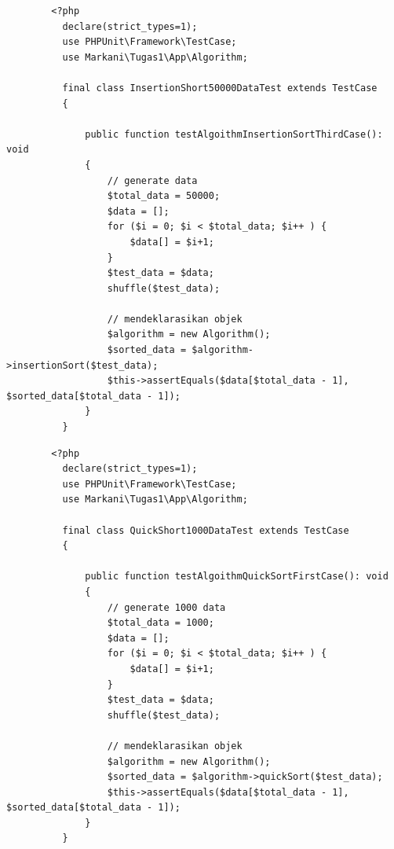 \documentclass[12pt,a4paper,oneside]{report}
\begin{document}
      \begin{lstlisting}
        <?php
          declare(strict_types=1);
          use PHPUnit\Framework\TestCase;
          use Markani\Tugas1\App\Algorithm;

          final class InsertionShort50000DataTest extends TestCase
          {

              public function testAlgoithmInsertionSortThirdCase(): void
              {
                  // generate data
                  $total_data = 50000;
                  $data = [];
                  for ($i = 0; $i < $total_data; $i++ ) {
                      $data[] = $i+1;
                  }
                  $test_data = $data;
                  shuffle($test_data);

                  // mendeklarasikan objek
                  $algorithm = new Algorithm();
                  $sorted_data = $algorithm->insertionSort($test_data);
                  $this->assertEquals($data[$total_data - 1], $sorted_data[$total_data - 1]);
              }
          }
      \end{lstlisting}

      \begin{lstlisting}
        <?php
          declare(strict_types=1);
          use PHPUnit\Framework\TestCase;
          use Markani\Tugas1\App\Algorithm;

          final class QuickShort1000DataTest extends TestCase
          {

              public function testAlgoithmQuickSortFirstCase(): void
              {
                  // generate 1000 data
                  $total_data = 1000;
                  $data = [];
                  for ($i = 0; $i < $total_data; $i++ ) {
                      $data[] = $i+1;
                  }
                  $test_data = $data;
                  shuffle($test_data);

                  // mendeklarasikan objek
                  $algorithm = new Algorithm();
                  $sorted_data = $algorithm->quickSort($test_data);
                  $this->assertEquals($data[$total_data - 1], $sorted_data[$total_data - 1]);
              }
          }
      \end{lstlisting}
\end{document}
